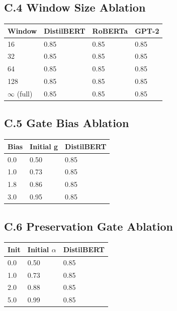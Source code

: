 \subsection{C.4 Window Size Ablation}

\begin{table}[H]
\centering
\small
\begin{tabular}{llll}
\toprule
\textbf{Window} & \textbf{DistilBERT} & \textbf{RoBERTa} & \textbf{GPT-2} \\
\midrule
16 & 0.85 & 0.85 & 0.85 \\
32 & 0.85 & 0.85 & 0.85 \\
64 & 0.85 & 0.85 & 0.85 \\
128 & 0.85 & 0.85 & 0.85 \\
$\infty$ (full) & 0.85 & 0.85 & 0.85 \\
\bottomrule
\end{tabular}
\end{table}

\subsection{C.5 Gate Bias Ablation}

\begin{table}[H]
\centering
\small
\begin{tabular}{lll}
\toprule
\textbf{Bias} & \textbf{Initial g} & \textbf{DistilBERT} \\
\midrule
0.0 & 0.50 & 0.85 \\
1.0 & 0.73 & 0.85 \\
1.8 & 0.86 & 0.85 \\
3.0 & 0.95 & 0.85 \\
\bottomrule
\end{tabular}
\end{table}

\subsection{C.6 Preservation Gate Ablation}

\begin{table}[H]
\centering
\small
\begin{tabular}{lll}
\toprule
\textbf{Init} & \textbf{Initial $\alpha$} & \textbf{DistilBERT} \\
\midrule
0.0 & 0.50 & 0.85 \\
1.0 & 0.73 & 0.85 \\
2.0 & 0.88 & 0.85 \\
5.0 & 0.99 & 0.85 \\
\bottomrule
\end{tabular}
\end{table}

